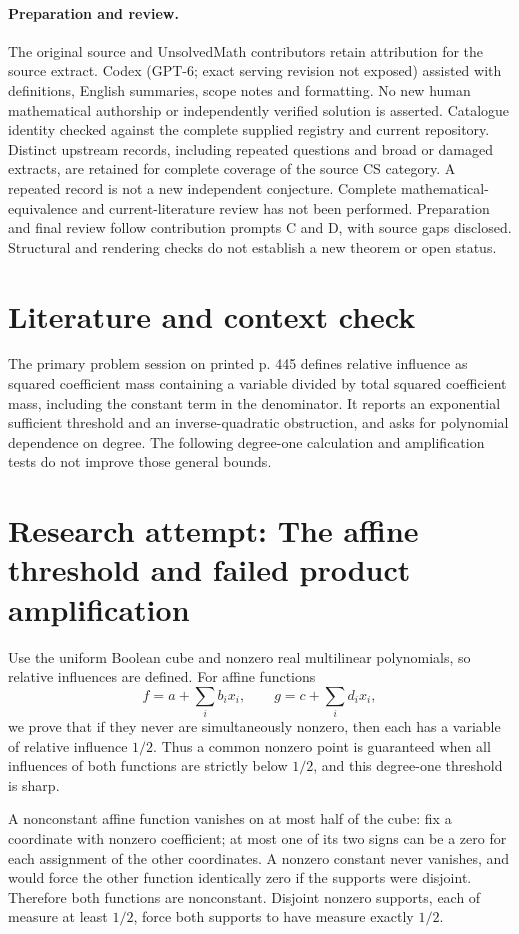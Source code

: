 \documentclass[11pt]{article}
\begin{document}
\paragraph{Preparation and review.}
The original source and UnsolvedMath contributors retain attribution for the source extract. Codex (GPT-6; exact serving revision not exposed) assisted with definitions, English summaries, scope notes and formatting. No new human mathematical authorship or independently verified solution is asserted. Catalogue identity checked against the complete supplied registry and current repository. Distinct upstream records, including repeated questions and broad or damaged extracts, are retained for complete coverage of the source CS category. A repeated record is not a new independent conjecture. Complete mathematical-equivalence and current-literature review has not been performed. Preparation and final review follow contribution prompts C and D, with source gaps disclosed. Structural and rendering checks do not establish a new theorem or open status.
\label{end:statement}

\section{Literature and context check}
The primary problem session on printed p. 445 defines relative influence as squared coefficient mass containing a variable divided by total squared coefficient mass, including the constant term in the denominator. It reports an exponential sufficient threshold and an inverse-quadratic obstruction, and asks for polynomial dependence on degree. The following degree-one calculation and amplification tests do not improve those general bounds.
\section{Research attempt: The affine threshold and failed product amplification}

Use the uniform Boolean cube and nonzero real multilinear polynomials, so relative influences are defined. For affine functions
\[
f=a+\sum_i b_i x_i,\qquad g=c+\sum_i d_i x_i,
\]
we prove that if they never are simultaneously nonzero, then each has a variable of relative influence $1/2$. Thus a common nonzero point is guaranteed when all influences of both functions are strictly below $1/2$, and this degree-one threshold is sharp.

A nonconstant affine function vanishes on at most half of the cube: fix a coordinate with nonzero coefficient; at most one of its two signs can be a zero for each assignment of the other coordinates. A nonzero constant never vanishes, and would force the other function identically zero if the supports were disjoint. Therefore both functions are nonconstant. Disjoint nonzero supports, each of measure at least $1/2$, force both supports to have measure exactly $1/2$.
\end{document}
